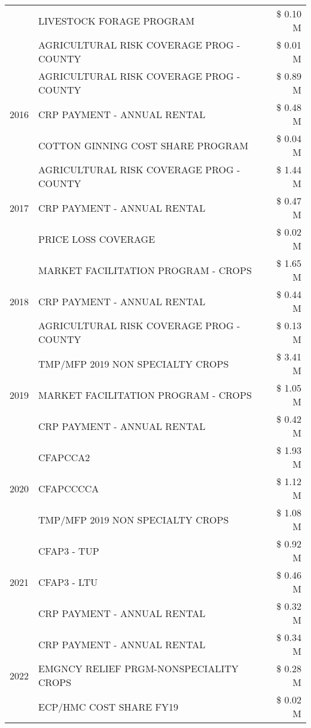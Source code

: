 \begin{tabular}{llr}
 & LIVESTOCK FORAGE PROGRAM & \$ 0.10 M \\
 & AGRICULTURAL RISK COVERAGE PROG - COUNTY & \$ 0.01 M \\
\cline{1-3}
\multirow[t]{3}{*}{2016} & AGRICULTURAL RISK COVERAGE PROG - COUNTY & \$ 0.89 M \\
 & CRP PAYMENT - ANNUAL RENTAL & \$ 0.48 M \\
 & COTTON GINNING COST SHARE PROGRAM & \$ 0.04 M \\
\cline{1-3}
\multirow[t]{3}{*}{2017} & AGRICULTURAL RISK COVERAGE PROG - COUNTY & \$ 1.44 M \\
 & CRP PAYMENT - ANNUAL RENTAL & \$ 0.47 M \\
 & PRICE LOSS COVERAGE & \$ 0.02 M \\
\cline{1-3}
\multirow[t]{3}{*}{2018} & MARKET FACILITATION PROGRAM - CROPS & \$ 1.65 M \\
 & CRP PAYMENT - ANNUAL RENTAL & \$ 0.44 M \\
 & AGRICULTURAL RISK COVERAGE PROG - COUNTY & \$ 0.13 M \\
\cline{1-3}
\multirow[t]{3}{*}{2019} & TMP/MFP 2019 NON SPECIALTY CROPS & \$ 3.41 M \\
 & MARKET FACILITATION PROGRAM - CROPS & \$ 1.05 M \\
 & CRP PAYMENT - ANNUAL RENTAL & \$ 0.42 M \\
\cline{1-3}
\multirow[t]{3}{*}{2020} & CFAPCCA2 & \$ 1.93 M \\
 & CFAPCCCCA & \$ 1.12 M \\
 & TMP/MFP 2019 NON SPECIALTY CROPS & \$ 1.08 M \\
\cline{1-3}
\multirow[t]{3}{*}{2021} & CFAP3 - TUP & \$ 0.92 M \\
 & CFAP3 - LTU & \$ 0.46 M \\
 & CRP PAYMENT - ANNUAL RENTAL & \$ 0.32 M \\
\cline{1-3}
\multirow[t]{3}{*}{2022} & CRP PAYMENT - ANNUAL RENTAL & \$ 0.34 M \\
 & EMGNCY RELIEF PRGM-NONSPECIALITY CROPS & \$ 0.28 M \\
 & ECP/HMC COST SHARE FY19 & \$ 0.02 M \\
\cline{1-3}
\bottomrule
\end{tabular}
